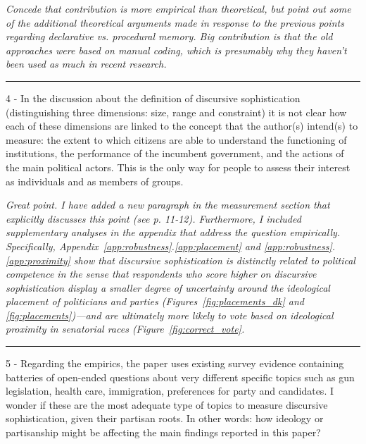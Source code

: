 \textit{Concede that contribution is more empirical than theoretical, but point out some of the additional theoretical arguments made in response to the previous points regarding declarative vs. procedural memory. Big contribution is that the old approaches were based on manual coding, which is presumably why they haven't been used as much in recent research.}


\rule{\linewidth}{.01cm}

4 - In the discussion about the definition of discursive sophistication (distinguishing three dimensions: size, range and constraint) it is not clear how each of these dimensions are linked to the concept that the author(s) intend(s) to measure: the extent to which citizens are able to understand the functioning of institutions, the performance of the incumbent government, and the actions of the main political actors. This is the only way for people to assess their interest as individuals and as members of groups.

\textit{Great point. I have added a new paragraph in the measurement section that explicitly discusses this point (see p. 11-12). Furthermore, I included supplementary analyses in the appendix that address the question empirically. Specifically, Appendix~\ref{app:robustness}.\ref{app:placement} and \ref{app:robustness}.\ref{app:proximity} show that discursive sophistication is distinctly related to {\normalfont political} competence in the sense that respondents who score higher on discursive sophistication display a smaller degree of uncertainty around the ideological placement of politicians and parties (Figures~\ref{fig:placements_dk} and \ref{fig:placements})---and are ultimately more likely to vote based on ideological proximity in senatorial races (Figure~\ref{fig:correct_vote}.}


\rule{\linewidth}{.01cm}

5 - Regarding the empirics, the paper uses existing survey evidence containing batteries of open-ended questions about very different specific topics such as gun legislation, health care, immigration, preferences for party and candidates. I wonder if these are the most adequate type of topics to measure discursive sophistication, given their partisan roots. In other words: how ideology or partisanship might be affecting the main findings reported in this paper?

